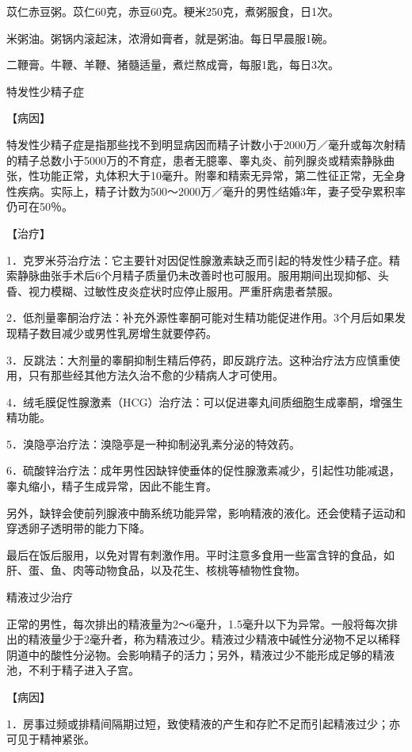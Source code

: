 \documentclass[12pt,UTF8,openany]{ctexbook}
\begin{document}
苡仁赤豆粥。苡仁60克，赤豆60克。粳米250克，煮粥服食，日1次。

米粥油。粥锅内滚起沫，浓滑如膏者，就是粥油。每日早晨服1碗。

二鞭膏。牛鞭、羊鞭、猪髓适量，煮烂熬成膏，每服1匙，每日3次。





特发性少精子症


【病因】

特发性少精子症是指那些找不到明显病因而精子计数小于2000万／毫升或每次射精的精子总数小于5000万的不育症，患者无臆睾、睾丸炎、前列腺炎或精索静脉曲张，性功能正常，丸体积大于10毫升。附睾和精索无异常，第二性征正常，无全身性疾病。实际上，精子计数为500～2000万／毫升的男性结婚3年，妻子受孕累积率仍可在50％。

【治疗】

1．克罗米芬治疗法：它主要针对因促性腺激素缺乏而引起的特发性少精子症。精索静脉曲张手术后6个月精子质量仍未改善时也可服用。服用期间出现抑郁、头昏、视力模糊、过敏性皮炎症状时应停止服用。严重肝病患者禁服。

2．低剂量睾酮治疗法：补充外源性睾酮可能对生精功能促进作用。3个月后如果发现精子数目减少或男性乳房增生就要停药。

3．反跳法：大剂量的睾酮抑制生精后停药，即反跳疗法。这种治疗法方应慎重使用，只有那些经其他方法久治不愈的少精病人才可使用。

4．绒毛膜促性腺激素（HCG）治疗法：可以促进睾丸间质细胞生成睾酮，增强生精功能。

5．溴隐亭治疗法：溴隐亭是一种抑制泌乳素分泌的特效药。

6．硫酸锌治疗法：成年男性因缺锌使垂体的促性腺激素减少，引起性功能减退，睾丸缩小，精子生成异常，因此不能生育。

另外，缺锌会使前列腺液中酶系统功能异常，影响精液的液化。还会使精子运动和穿透卵子透明带的能力下降。

最后在饭后服用，以免对胃有刺激作用。平时注意多食用一些富含锌的食品，如肝、蛋、鱼、肉等动物食品，以及花生、核桃等植物性食物。





精液过少治疗


正常的男性，每次排出的精液量为2～6毫升，1.5毫升以下为异常。一般将每次排出的精液量少于2毫升者，称为精液过少。精液过少精液中碱性分泌物不足以稀释阴道中的酸性分泌物。会影响精子的活力；另外，精液过少不能形成足够的精液池，不利于精子进入子宫。

【病因】

1．房事过频或排精间隔期过短，致使精液的产生和存贮不足而引起精液过少；亦可见于精神紧张。
\end{document}
